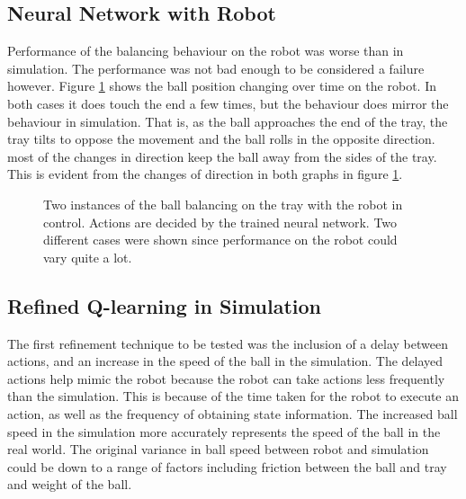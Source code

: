 \documentclass[12pt,a4paper]{article}
\begin{document}
\subsection{Neural Network with Robot}
Performance of the balancing behaviour on the robot was worse than in simulation. The performance was not bad enough to be considered a failure however. Figure \ref{nn_nao} shows the ball position changing over time on the robot. In both cases it does touch the end a few times, but the behaviour does mirror the behaviour in simulation. That is, as the ball approaches the end of the tray, the tray tilts to oppose the movement and the ball rolls in the opposite direction. most of the changes in direction keep the ball away from the sides of the tray. This is evident from the changes of direction in both graphs in figure \ref{nn_nao}.
\begin{figure}[H]
	\centering
	\caption{Two instances of the ball balancing on the tray with the robot in control. Actions are decided by the trained neural network. Two different cases were shown since performance on the robot could vary quite a lot.}
	\label{nn_nao}
\end{figure}
\subsection{Refined Q-learning in Simulation}
The first refinement technique to be tested was the inclusion of a delay between actions, and an increase in the speed of the ball in the simulation. The delayed actions help mimic the robot because the robot can take actions less frequently than the simulation. This is because of the time taken for the robot to execute an action, as well as the frequency of obtaining state information. The increased ball speed in the simulation more accurately represents the speed of the ball in the real world. The original variance in ball speed between robot and simulation could be down to a range of factors including friction between the ball and tray and weight of the ball.
\end{document}
